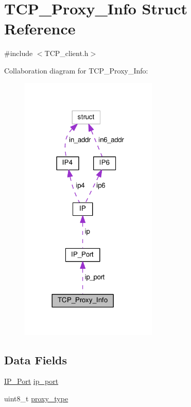 \hypertarget{struct_t_c_p___proxy___info}{\section{T\+C\+P\+\_\+\+Proxy\+\_\+\+Info Struct Reference}
\label{struct_t_c_p___proxy___info}
}


{\ttfamily \#include $<$T\+C\+P\+\_\+client.\+h$>$}



Collaboration diagram for T\+C\+P\+\_\+\+Proxy\+\_\+\+Info\+:
\nopagebreak
\begin{figure}[H]
\begin{center}
\leavevmode
\includegraphics[width=185pt]{dc/dc2/struct_t_c_p___proxy___info__coll__graph}
\end{center}
\end{figure}
\subsection*{Data Fields}
\begin{DoxyCompactItemize}
\item 
\hyperlink{struct_i_p___port}{I\+P\+\_\+\+Port} \hyperlink{struct_t_c_p___proxy___info_a86e2a5a56c0dd22df6e8b8a10e40f9e4}{ip\+\_\+port}
\item 
uint8\+\_\+t \hyperlink{struct_t_c_p___proxy___info_a23a098bd0536ae2000e1944e353b7d8b}{proxy\+\_\+type}
\end{DoxyCompactItemize}


